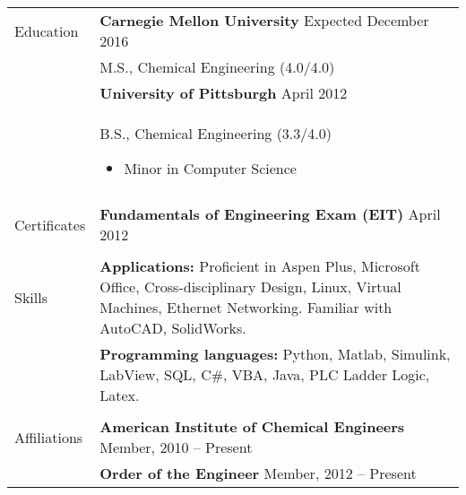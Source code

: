 \documentclass[11pt]{article}
\begin{document}
\begin{tabular}[t]{@{}p{1.15in} @{}p{5.35in}}
{Education}
&
\textbf{Carnegie Mellon University} \hfill Expected December 2016 \vspace{0.015in} \\ &
M.S., Chemical Engineering (4.0/4.0) \vspace{0.015in}
\vspace{0.5\baselineskip}
\\
&
\textbf{University of Pittsburgh} \hfill April 2012 \vspace{0.015in} \\ &
B.S., Chemical Engineering (3.3/4.0) \vspace{0.015in}
\begin{itemize}
    \renewcommand{\labelitemi}{$\diamond$}
    \item Minor in Computer Science
\end{itemize}
\\
\vspace{0.5\baselineskip}
\\

{Certificates}
&
\textbf{Fundamentals of Engineering Exam (EIT)} \hfill April 2012
\vspace{0.5\baselineskip}
\\
\vspace{0.5\baselineskip}
\\

{Skills}
&
\textbf{Applications:} Proficient in Aspen Plus, Microsoft Office, Cross-disciplinary Design, Linux, Virtual Machines, Ethernet Networking. Familiar with AutoCAD, SolidWorks.
\vspace{0.5\baselineskip}
\\
&
\textbf{Programming languages:} Python, Matlab, Simulink, LabView, SQL, C\#, VBA, Java, PLC Ladder Logic, Latex.
\vspace{0.5\baselineskip}
\\
\vspace{0.5\baselineskip}
\\

{Affiliations}
&
\textbf{American Institute of Chemical Engineers} \hfill{Member, 2010 -- Present}
\\
&
\textbf{Order of the Engineer} \hfill{Member, 2012 -- Present}

\end{tabular}
\end{document}
